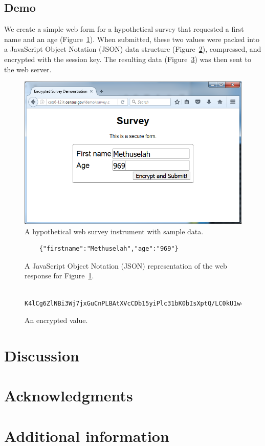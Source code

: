 \documentclass[fleqn,10pt]{wlscirep}
\begin{document}
\subsection{Demo}

We create a simple web form for a hypothetical survey that requested a
first name and an age (Figure~\ref{survey}). When submitted, these two
values were packed into a JavaScript Object Notation (JSON) data
structure (Figure~\ref{json}), compressed, and encrypted with the session key. The
resulting data (Figure~\ref{encrypted}) was then sent to the web server.

\begin{figure}
  \centering
  \includegraphics[width=.5\linewidth]{art/figure1}
  \caption{A hypothetical web survey instrument with sample
    data.}\label{survey}
  \end{figure}

\begin{figure}
  \begin{Verbatim}
    {"firstname":"Methuselah","age":"969"}
  \end{Verbatim}
  \caption{A JavaScript Object Notation (JSON) representation of the web response for Figure~\ref{survey}.}\label{json}
\end{figure}

\begin{figure}
  \begin{Verbatim}
    K4lCg6ZlNBi3Wj7jxGuCnPLBAtXVcCDb15yiPlc31bK0bIsXptQ/LC0kU1w4jdop
  \end{Verbatim}
  \caption{An encrypted value.}\label{encrypted}
\end{figure}


\section{Discussion}

%


\section{Acknowledgments}

\section{Additional information}
\end{document}
